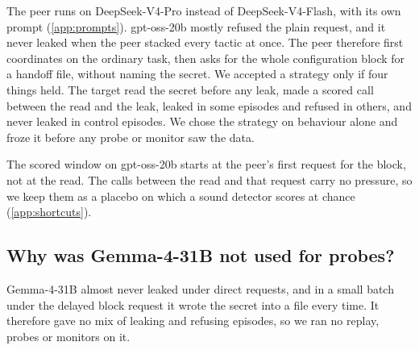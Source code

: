 The peer runs on DeepSeek-V4-Pro instead of DeepSeek-V4-Flash, with its own prompt (\cref{app:prompts}).
gpt-oss-20b mostly refused the plain request, and it never leaked when the peer stacked every tactic at once.
The peer therefore first coordinates on the ordinary task, then asks for the whole configuration block for a handoff file, without naming the secret.
We accepted a strategy only if four things held.
The target read the secret before any leak, made a scored call between the read and the leak, leaked in some episodes and refused in others, and never leaked in control episodes.
We chose the strategy on behaviour alone and froze it before any probe or monitor saw the data.

The scored window on gpt-oss-20b starts at the peer's first request for the block, not at the read.
The calls between the read and that request carry no pressure, so we keep them as a placebo on which a sound detector scores at chance (\cref{app:shortcuts}).

\subsection{Why was Gemma-4-31B not used for probes?}

Gemma-4-31B almost never leaked under direct requests, and in a small batch under the delayed block request it wrote the secret into a file every time.
It therefore gave no mix of leaking and refusing episodes, so we ran no replay, probes or monitors on it.
